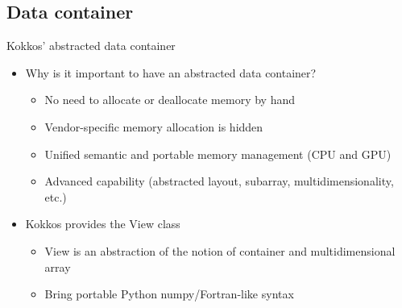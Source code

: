 \documentclass[aspectratio=169]{beamer}
\begin{document}

\subsection[Data container]{Data container}


\begin{frame}[fragile]{Kokkos' abstracted data container}
    \begin{itemize}
        \item Why is it important to have an abstracted data container?
        \begin{itemize}
            \item No need to allocate or deallocate memory by hand
            \item Vendor-specific memory allocation is hidden
            \item Unified semantic and portable memory management (CPU and GPU)
            \item Advanced capability (abstracted layout, subarray, multidimensionality, etc.)
        \end{itemize}
        \item Kokkos provides the View class
        \begin{itemize}
            \item View is an abstraction of the notion of container and multidimensional array
            \item Bring portable Python numpy/Fortran-like syntax
        \end{itemize}
    \end{itemize}
\end{frame}

\end{document}
